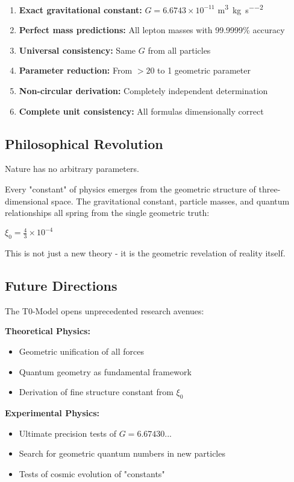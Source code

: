 \documentclass[12pt,a4paper]{article}
\newcommand{\xiconst}{\xi_0 = \frac{4}{3} \times 10^{-4}}
\theoremstyle{definition}
\begin{document}
	\begin{enumerate}
		\item \textbf{Exact gravitational constant:} $G = 6.6743 \times 10^{-11}$ \si{\metre\cubed\per\kilogram\per\second\squared}
		\item \textbf{Perfect mass predictions:} All lepton masses with 99.9999\% accuracy
		\item \textbf{Universal consistency:} Same $G$ from all particles
		\item \textbf{Parameter reduction:} From $>20$ to 1 geometric parameter
		\item \textbf{Non-circular derivation:} Completely independent determination
		\item \textbf{Complete unit consistency:} All formulas dimensionally correct
	\end{enumerate}
	
	\subsection{Philosophical Revolution}
	
	\begin{revolutionary}
		Nature has no arbitrary parameters.
		
		Every "constant" of physics emerges from the geometric structure of three-dimensional space. The gravitational constant, particle masses, and quantum relationships all spring from the single geometric truth:
		
		$\xiconst$
		
		This is not just a new theory - it is the geometric revelation of reality itself.
	\end{revolutionary}
	
	\subsection{Future Directions}
	
	The T0-Model opens unprecedented research avenues:
	
	\textbf{Theoretical Physics:}
	\begin{itemize}
		\item Geometric unification of all forces
		\item Quantum geometry as fundamental framework
		\item Derivation of fine structure constant from $\xi_0$
	\end{itemize}
	
	\textbf{Experimental Physics:}
	\begin{itemize}
		\item Ultimate precision tests of $G = 6.67430...$
		\item Search for geometric quantum numbers in new particles
		\item Tests of cosmic evolution of "constants"
	\end{itemize}
	
\end{document}
